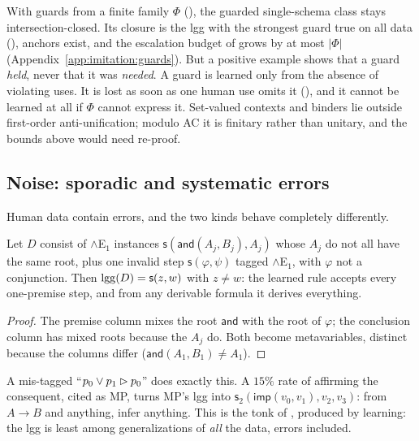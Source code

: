 \begin{remark}\label{rem:imitation:guards}
With guards from a finite family $\Phi$ (), the guarded single-schema class stays intersection-closed. Its closure is the lgg with the strongest guard true on all data (), anchors exist, and the escalation budget of  grows by at most $|\Phi|$ (Appendix~\ref{app:imitation:guards}). But a positive example shows that a guard \emph{held}, never that it was \emph{needed}. A guard is learned only from the absence of violating uses. It is lost as soon as one human use omits it (), and it cannot be learned at all if $\Phi$ cannot express it. Set-valued contexts and binders lie outside first-order anti-unification; modulo AC it is finitary rather than unitary, and the bounds above would need re-proof.
\end{remark}

\subsection{Noise: sporadic and systematic errors}\label{sec:imitation:noise}

Human data contain errors, and the two kinds behave completely differently.

\begin{proposition}\label{prop:imitation:collapse}
Let $D$ consist of $\wedge$E$_1$ instances $\mathsf s(\mathsf{and}(A_j,B_j),A_j)$ whose $A_j$ do not all have the same root, plus one invalid step $\mathsf s(\varphi,\psi)$ tagged $\wedge$E$_1$, with $\varphi$ not a conjunction. Then $\mathrm{lgg}(D)=\mathsf s(z,w)$ with $z\neq w$: the learned rule accepts every one-premise step, and from any derivable formula it derives everything.
\end{proposition}

\begin{proof}
The premise column mixes the root $\mathsf{and}$ with the root of $\varphi$; the conclusion column has mixed roots because the $A_j$ do. Both become metavariables, distinct because the columns differ ($\mathsf{and}(A_1,B_1)\neq A_1$).
\end{proof}

\noindent{} A mis-tagged ``$p_0\vee p_1\rhd p_0$'' does exactly this. A $15\%$ rate of affirming the consequent, cited as MP, turns MP's lgg into $\mathsf s_2(\mathsf{imp}(v_0,v_1),v_2,v_3)$: from $A\to B$ and anything, infer anything. This is the tonk of , produced by learning: the lgg is least among generalizations of \emph{all} the data, errors included.


